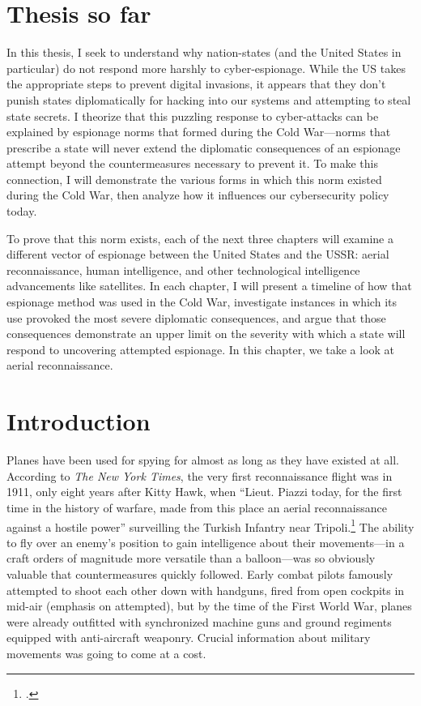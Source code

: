 \documentclass{report}
\begin{document}
\begin{refsegment}

\section*{Thesis so far}
\begin{em}
In this thesis, I seek to understand why nation-states (and the United States in particular) do not respond more harshly to cyber-espionage. While the US takes the appropriate steps to prevent digital invasions, it appears that they don't punish states diplomatically for hacking into our systems and attempting to steal state secrets. I theorize that this puzzling response to cyber-attacks can be explained by espionage norms that formed during the Cold War---norms that prescribe a state will never extend the diplomatic consequences of an espionage attempt beyond the countermeasures necessary to prevent it. To make this connection, I will demonstrate the various forms in which this norm existed during the Cold War, then analyze how it influences our cybersecurity policy today.

To prove that this norm exists, each of the next three chapters will examine a different vector of espionage between the United States and the USSR: aerial reconnaissance, human intelligence, and other technological intelligence advancements like satellites. In each chapter, I will present a timeline of how that espionage method was used in the Cold War, investigate instances in which its use provoked the most severe diplomatic consequences, and argue that those consequences demonstrate an upper limit on the severity with which a state will respond to uncovering attempted espionage. In this chapter, we take a look at aerial reconnaissance.
\end{em}


\section{Introduction}
Planes have been used for spying for almost as long as they have existed at all. According to \emph{The New York Times}, the very first reconnaissance flight was in 1911, only eight years after Kitty Hawk, when ``Lieut. Piazzi today, for the first time in the history of warfare, made from this place an aerial reconnaissance against a hostile power'' surveilling the Turkish Infantry near Tripoli.\footcite{special_cable_to_the_new_york_times_air_1911} The ability to fly over an enemy's position to gain intelligence about their movements---in a craft orders of magnitude more versatile than a balloon---was so obviously valuable that countermeasures quickly followed. Early combat pilots famously attempted to shoot each other down with handguns, fired from open cockpits in mid-air (emphasis on attempted), but by the time of the First World War, planes were already outfitted with synchronized machine guns and ground regiments equipped with anti-aircraft weaponry. Crucial information about military movements was going to come at a cost.


\end{refsegment}
\end{document}
